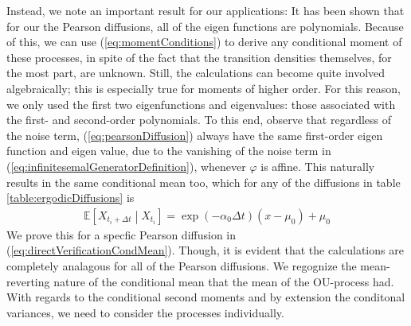 Instead, we note an important result for our applications: It has been shown \cite{FormanSorensen2008} that for our the Pearson diffusions, all of the eigen functions are polynomials. Because of this, we can use (\ref{eq:momentConditions}) to derive any conditional moment of these processes, in spite of the fact that the transition densities themselves, for the most part, are unknown. Still, the calculations can become quite involved algebraically; this is especially true for moments of higher order. For this reason, we only used the first two eigenfunctions and eigenvalues: those associated with the first- and second-order polynomials. To this end, observe that regardless of the noise term, (\ref{eq:pearsonDiffusion}) always have the same first-order eigen function and eigen value, due to the vanishing of the noise term in (\ref{eq:infinitesemalGeneratorDefinition}), whenever $\varphi$ is affine. This naturally results in the same conditional mean too, which for any of the diffusions in table \ref{table:ergodicDiffusions} is
\begin{align}
    \mathbb{E}\left[X_{t_{i}+\Delta t} \middle|X_{t_{i}} \right] = \exp\left(-\alpha_0\Delta t\right)\left(x-\mu_0\right) + \mu_0
\end{align}
We prove this for a specfic Pearson diffusion in (\ref{eq:directVerificationCondMean}). Though, it is evident that the calculations are completely analagous for all of the Pearson diffusions. We regognize the mean-reverting nature of the conditional mean that the mean of the OU-process had. With regards to the conditional second moments and by extension the conditonal variances, we need to consider the processes individually.
